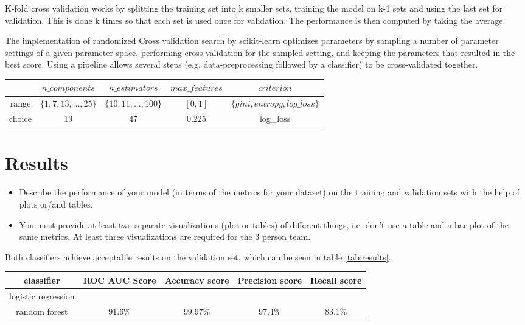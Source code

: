 \documentclass[a4, 10 pt, conference]{ieeeconf}  %
\begin{document}
K-fold cross validation works by splitting the training set into k smaller sets, training the model on k-1 sets and using the last set for validation. This is done k times so that each set is used once for validation. The performance is then computed by taking the average. \cite{sl.cv}

The implementation of randomized Cross validation search by scikit-learn optimizes parameters by sampling a number of parameter settings of a given parameter space, performing cross validation for the sampled setting, and keeping the parameters that resulted in the best score. Using a pipeline allows several steps (e.g. data-preprocessing followed by a classifier) to be cross-validated together. \cite{sl.rcv}

\begin{table*}[hbt]
	\begin{tabular}{c|c|c|c|c}
		& $n\_components$ & $n\_estimators$ & $max\_features$ & $criterion$\\
		\hline range & $\{1, 7, 13,\dots , 25\}$ & $\{10, 11,\dots, 100\}$ & $[0,1]$ & $\{gini, entropy, log\_loss\}$\\
		\hline choice & 19 & 47 & 0.225 & log\_loss
	\end{tabular}
	\caption{Hyperparameter selection random forest}
	\label{tab:param.rf}
\end{table*}

\section{Results}
\label{sec:results}

{\color{blue}

\begin{itemize}
	\item Describe the performance of your model (in terms of the metrics for your dataset) on the training and validation sets with the help of plots or/and tables.
	\item You must provide at least two separate visualizations
          (plot or tables) of different things, i.e. don’t use a table
          and a bar plot of the same metrics. At least three
           visualizations are required for the 3 person team.
\end{itemize}
}

Both classifiers achieve acceptable results on the validation set, which can be seen in table \ref{tab:results}.

\begin{table*}[hbt]
	\begin{tabular}{c|c|c|c|c}
		classifier & ROC AUC Score & Accuracy score & Precision score & Recall score\\
		\hline logistic regression & & & &\\
		\hline random forest & 91.6\% & 99.97\% & 97.4\% & 83.1\%
	\end{tabular}
	\caption{Hyperparameter selection random forest}
	\label{tab:results}
\end{table*}
\end{document}
